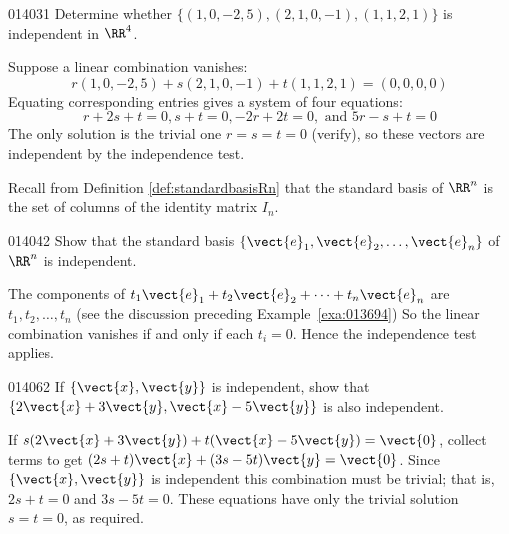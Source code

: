 \begin{example}{}{014031}
Determine whether $\{(1, 0, -2, 5), (2, 1, 0, -1), (1, 1, 2, 1)\}$ is independent in $\RR^4$.

\begin{solution}
  Suppose a linear combination vanishes:
\begin{equation*}
r(1, 0, -2, 5) + s(2, 1, 0, -1) + t(1, 1, 2, 1) = (0, 0, 0, 0)
\end{equation*}
Equating corresponding entries gives a system of four equations:
\begin{equation*}
r + 2s + t = 0, s + t = 0, -2r + 2t = 0, \mbox{ and } 5r -s + t = 0
\end{equation*}
The only solution is the trivial one $r = s = t = 0$ (verify), so these vectors are independent by the independence test.
\end{solution}
\end{example}

Recall from Definition \ref{def:standardbasisRn} that the standard basis of  $\RR^n$ is the set of columns
of the identity matrix $I_{n}$. 

\begin{example}{}{014042}
Show that the standard basis $\{\vect{e}_{1}, \vect{e}_{2}, \dots, \vect{e}_{n}\}$ of $\RR^n$ is independent.

\begin{solution}
The components of $t_{1}\vect{e}_{1} + t_{2}\vect{e}_{2} + \dots + t_{n}\vect{e}_{n}$ are $t_{1}, t_{2}, \dots, t_{n}$ (see the discussion preceding Example~\ref{exa:013694}) So the linear combination vanishes if and only if each $t_{i} = 0$. Hence the independence test applies.
\end{solution}
\end{example}

\begin{example}{}{014062}
If $\{\vect{x}, \vect{y}\}$ is independent, show that $\{2\vect{x} + 3\vect{y}, \vect{x} - 5\vect{y}\}$ is also independent.

\begin{solution}
If $s(2\vect{x} + 3\vect{y}) + t(\vect{x} - 5\vect{y}) = \vect{0}$, collect terms to get $(2s + t)\vect{x} + (3s - 5t)\vect{y} = \vect{0}$. Since $\{\vect{x}, \vect{y}\}$ is independent this combination must be trivial; that is, $2s + t = 0$ and $3s - 5t = 0$. These equations have only the trivial solution $s = t = 0$, as required.
\end{solution}
\end{example}

